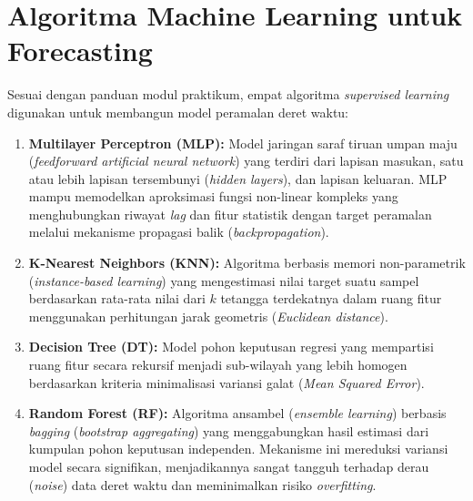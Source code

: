 \documentclass[a4paper,oneside,11pt]{book}
\begin{document}
\section{Algoritma Machine Learning untuk Forecasting}
Sesuai dengan panduan modul praktikum, empat algoritma \textit{supervised learning} digunakan untuk membangun model peramalan deret waktu:
\begin{enumerate}
    \item \textbf{Multilayer Perceptron (MLP):} Model jaringan saraf tiruan umpan maju (\textit{feedforward artificial neural network}) yang terdiri dari lapisan masukan, satu atau lebih lapisan tersembunyi (\textit{hidden layers}), dan lapisan keluaran. MLP mampu memodelkan aproksimasi fungsi non-linear kompleks yang menghubungkan riwayat \textit{lag} dan fitur statistik dengan target peramalan melalui mekanisme propagasi balik (\textit{backpropagation}).
    \item \textbf{K-Nearest Neighbors (KNN):} Algoritma berbasis memori non-parametrik (\textit{instance-based learning}) yang mengestimasi nilai target suatu sampel berdasarkan rata-rata nilai dari $k$ tetangga terdekatnya dalam ruang fitur menggunakan perhitungan jarak geometris (\textit{Euclidean distance}).
    \item \textbf{Decision Tree (DT):} Model pohon keputusan regresi yang mempartisi ruang fitur secara rekursif menjadi sub-wilayah yang lebih homogen berdasarkan kriteria minimalisasi variansi galat (\textit{Mean Squared Error}).
    \item \textbf{Random Forest (RF):} Algoritma ansambel (\textit{ensemble learning}) berbasis \textit{bagging} (\textit{bootstrap aggregating}) yang menggabungkan hasil estimasi dari kumpulan pohon keputusan independen. Mekanisme ini mereduksi variansi model secara signifikan, menjadikannya sangat tangguh terhadap derau (\textit{noise}) data deret waktu dan meminimalkan risiko \textit{overfitting}.
\end{enumerate}

\clearpage
\end{document}
